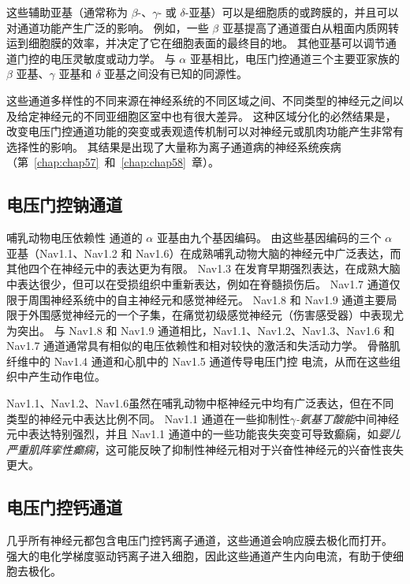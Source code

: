 这些辅助亚基（通常称为 $\beta$-、$\gamma$- 或 $\delta$-亚基）可以是细胞质的或跨膜的，并且可以对通道功能产生广泛的影响。
例如，一些 $\beta$ 亚基提高了通道蛋白从粗面内质网转运到细胞膜的效率，并决定了它在细胞表面的最终目的地。
其他亚基可以调节通道门控的电压灵敏度或动力学。
与 $\alpha$ 亚基相比，电压门控通道三个主要亚家族的 $\beta$ 亚基、$\gamma$ 亚基和 $\delta$ 亚基之间没有已知的同源性。


这些通道多样性的不同来源在神经系统的不同区域之间、不同类型的神经元之间以及给定神经元的不同亚细胞区室中也有很大差异。
这种区域分化的必然结果是，改变电压门控通道功能的突变或表观遗传机制可以对神经元或肌肉功能产生非常有选择性的影响。
其结果是出现了大量称为离子通道病的神经系统疾病（第~\ref{chap:chap57}~和~\ref{chap:chap58}~章）。



\subsection{电压门控钠通道}

哺乳动物电压依赖性  通道的 $\alpha$ 亚基由九个基因编码。
由这些基因编码的三个 $\alpha$ 亚基（Nav1.1、Nav1.2 和 Nav1.6）在成熟哺乳动物大脑的神经元中广泛表达，而其他四个在神经元中的表达更为有限。
Nav1.3 在发育早期强烈表达，在成熟大脑中表达很少，但可以在受损组织中重新表达，例如在脊髓损伤后。
Nav1.7 通道仅限于周围神经系统中的自主神经元和感觉神经元。
Nav1.8 和 Nav1.9 通道主要局限于外围感觉神经元的一个子集，在痛觉初级感觉神经元（伤害感受器）中表现尤为突出。
与 Nav1.8 和 Nav1.9 通道相比，Nav1.1、Nav1.2、Nav1.3、Nav1.6 和 Nav1.7 通道通常具有相似的电压依赖性和相对较快的激活和失活动力学。 
骨骼肌纤维中的 Nav1.4 通道和心肌中的 Nav1.5 通道传导电压门控  电流，从而在这些组织中产生动作电位。


Nav1.1、Nav1.2、Nav1.6虽然在哺乳动物中枢神经元中均有广泛表达，但在不同类型的神经元中表达比例不同。
Nav1.1 通道在一些抑制性\textit{$\gamma$-氨基丁酸能}中间神经元中表达特别强烈，并且 Nav1.1 通道中的一些功能丧失突变可导致癫痫，如\textit{婴儿严重肌阵挛性癫痫}，这可能反映了抑制性神经元相对于兴奋性神经元的兴奋性丧失更大。



\subsection{电压门控钙通道}

几乎所有神经元都包含电压门控钙离子通道，这些通道会响应膜去极化而打开。
强大的电化学梯度驱动钙离子进入细胞，因此这些通道产生内向电流，有助于使细胞去极化。


